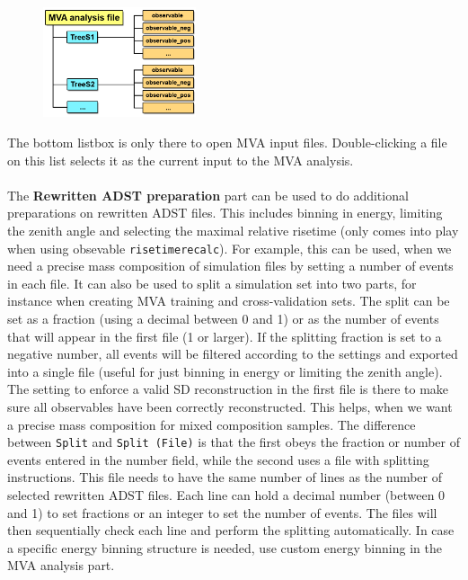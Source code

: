 \documentclass[12pt,a4paper]{report}
\begin{document}
\begin{figure}[H]
\centerline{\includegraphics[width=0.40\textwidth]{figures/file_structure.png}}
\end{figure}
{\noindent}The bottom listbox is only there to open MVA input files. Double-clicking a file on this list selects it as the current input to the MVA analysis.\\
\\
The \textbf{Rewritten ADST preparation} part can be used to do additional preparations on rewritten ADST files. This includes binning in energy, limiting the zenith angle and selecting the maximal relative risetime (only comes into play when using obsevable \texttt{risetimerecalc}). For example, this can be used, when we need a precise mass composition of simulation files by setting a number of events in each file. It can also be used to split a simulation set into two parts, for instance when creating MVA training and cross-validation sets. The split can be set as a fraction (using a decimal between 0 and 1) or as the number of events that will appear in the first file (1 or larger). If the splitting fraction is set to a negative number, all events will be filtered according to the settings and exported into a single file (useful for just binning in energy or limiting the zenith angle). The setting to enforce a valid SD reconstruction in the first file is there to make sure all observables have been correctly reconstructed. This helps, when we want a precise mass composition for mixed composition samples. The difference between \texttt{Split} and \texttt{Split (File)} is that the first obeys the fraction or number of events entered in the number field, while the second uses a file with splitting instructions. This file needs to have the same number of lines as the number of selected rewritten ADST files. Each line can hold a decimal number (between 0 and 1) to set fractions or an integer to set the number of events. The files will then sequentially check each line and perform the splitting automatically. In case a specific energy binning structure is needed, use custom energy binning in the MVA analysis part.\\
\end{document}

